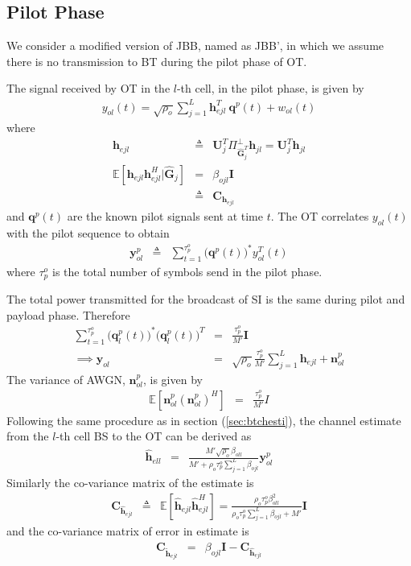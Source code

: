 \documentclass[10pt, a4paper, twoside,fleqn]{article}
\begin{document}
\subsection{Pilot Phase}
    We consider a modified version of JBB, named as JBB', in which we assume there is no transmission to BT during the pilot phase of OT. 
    
    The signal received by OT in the $l$-th cell, in the pilot phase, is given by
\begin{eqnarray}
	y_{ol}(t)=\sqrt{\rho_o} \sum_{j=1}^{L} \pmb{h}^T_{ejl} \ \pmb{q}^p(t) + w_{ol}(t) 
\end{eqnarray}
where
\begin{eqnarray}
	\pmb{h}_{ejl} &\triangleq& \pmb{U}_j^T\Pi^{\perp}_{{\widehat{\pmb{G}}^T_j}}\pmb{h}_{jl} = \pmb{U}_j^T\pmb{h}_{jl} \\
    \mathbb{E}[\pmb{h}_{ejl}\pmb{h}^H_{ejl}|\pmb{\widehat{G}}_j] &=& \beta_{ojl}\pmb{I} \nonumber \\
                                           &\triangleq& \pmb{C}_{\pmb{h}_{ejl}} \nonumber
\end{eqnarray}
and $\pmb{q}^p(t)$ are the known pilot signals sent at time $t$.
The OT correlates $y_{ol}(t)$ with the pilot sequence to obtain
\begin{eqnarray}
	\pmb{y}_{ol}^{p} &\triangleq& \sum_{t=1}^{\tau_p^o} \Big(\pmb{q}^{p}(t)\Big)^* y^T_{ol}(t)\nonumber
\end{eqnarray}
where $\tau_p^o$ is the total number of symbols send in the pilot phase.

The total power transmitted for the broadcast of SI is the same during pilot and payload phase. Therefore
\begin{eqnarray}
    \sum\limits_{t=1}^{\tau_p^o}\Big(\pmb{q}^p_{l}(t)\Big)^*\Big(\pmb{q}^p_{l}(t)\Big)^T&=&\frac{\tau_p^o}{M'}\pmb{I} \\
\implies \pmb{y}_{ol} &=& \sqrt{\rho_o}\frac{\tau_p^o}{M'}\sum_{j=1}^{L}\pmb{h}_{ejl}+\pmb{n}^p_{ol}
\end{eqnarray}
The variance of AWGN, $\pmb{n}_{ol}^p$, is given by
\begin{eqnarray}
	\mathbb{E}[\pmb{n}^p_{ol}(\pmb{n}^p_{ol})^H] &=& \frac{\tau_p^o}{M'}I \nonumber
\end{eqnarray}
Following the same procedure as in section (\ref{sec:btchesti}), the channel estimate from the $l$-th cell BS to the OT can be derived as 
\begin{eqnarray}\label{eqn:otchesti}
	\pmb{\hat h}_{ell} &=& \frac{M'\sqrt{\rho_o}\beta_{oll}}{M'+\rho_o\tau_p^o\sum\limits_{j=1}^{L}\beta_{ojl}}\pmb{y}^p_{ol}
\end{eqnarray}
Similarly the co-variance matrix of the estimate is
\begin{eqnarray}
	\pmb{C}_{\pmb{\hat h}_{ejl}} &\triangleq& \mathbb{E}[\pmb{\hat h}_{ejl}\pmb{\hat h}^H_{ejl}] = \frac{\rho_o\tau_p^o\beta^2_{oll}}{\rho_o\tau_p^o\sum\limits_{j=1}^{L}\beta_{ojl}+M'}\pmb{I}
\end{eqnarray}
and the co-variance matrix of error in estimate is
\begin{eqnarray}
	\pmb{C}_{\pmb{\widetilde{h}}_{ejl}} &=& \beta_{ojl}\pmb{I} - 	\pmb{C}_{\pmb{\hat h}_{ejl}}
\end{eqnarray}
\end{document}

